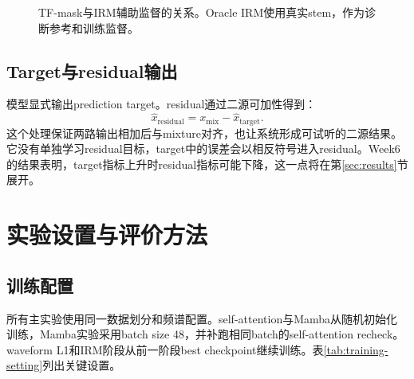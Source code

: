 \documentclass[UTF8,12pt,a4paper]{ctexart}
\begin{document}
\begin{figure}[H]
  \centering
  \caption{TF-mask与IRM辅助监督的关系。Oracle IRM使用真实stem，作为诊断参考和训练监督。}
  \label{fig:mask-intuition}
\end{figure}

\subsection{Target与residual输出}

模型显式输出prediction target。residual通过二源可加性得到：
\begin{equation}
  \hat x_{\mathrm{residual}}=x_{\mathrm{mix}}-\hat x_{\mathrm{target}}.
\end{equation}
这个处理保证两路输出相加后与mixture对齐，也让系统形成可试听的二源结果。它没有单独学习residual目标，target中的误差会以相反符号进入residual。Week6的结果表明，target指标上升时residual指标可能下降，这一点将在第\ref{sec:results}节展开。

\section{实验设置与评价方法}

\subsection{训练配置}

所有主实验使用同一数据划分和频谱配置。self-attention与Mamba从随机初始化训练，Mamba实验采用batch size 48，并补跑相同batch的self-attention recheck。waveform L1和IRM阶段从前一阶段best checkpoint继续训练。表\ref{tab:training-setting}列出关键设置。
\end{document}
